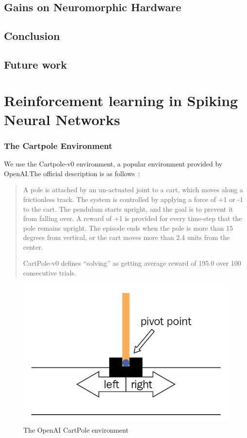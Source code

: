\documentclass[fyp]{socreport}
\begin{document}
\section{Gains on Neuromorphic Hardware\label{sec:snnrl_neuromorphic}}

\section{Conclusion\label{sec:snnrl_conclusion}}

\section{Future work\label{sec:snnrl_future_work}}

\chapter{Reinforcement learning in Spiking Neural Networks\label{cha:snnrl}}


\subsection{The Cartpole Environment}


We use the Cartpole-v0 environment, a popular environment provided by
OpenAI.\@ The official description is as follows~\cite{openai_gym}:

\begin{quote} A pole is attached by an un-actuated joint to a cart, which moves
along a frictionless track. The system is controlled by applying a force of +1
or -1 to the cart. The pendulum starts upright, and the goal is to prevent it
from falling over. A reward of +1 is provided for every time-step that the pole
remains upright. The episode ends when the pole is more than 15 degrees from
vertical, or the cart moves more than 2.4 units from the center.

CartPole-v0 defines ``solving'' as getting average reward of 195.0 over 100
consecutive trials.
\end{quote}

\begin{figure}[htbp] \centering
  \includegraphics[width=.9\linewidth]{images/openai_gym.png}
  \caption{The OpenAI CartPole environment}
\end{figure}
\end{document}
